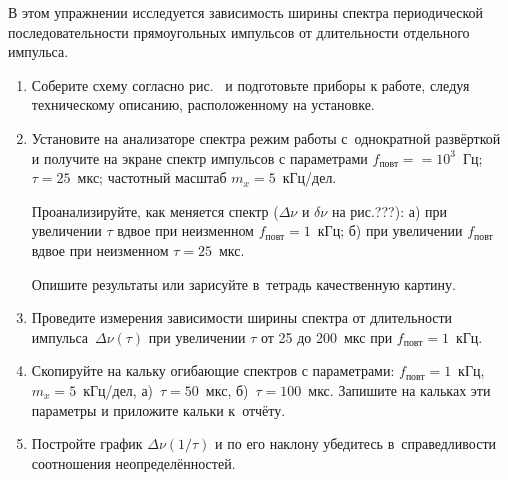 \begin{lab:task}

В этом упражнении исследуется зависимость ширины спектра периодической
последовательности прямоугольных импульсов от длительности отдельного импульса.

\begin{enumerate}
\item Соберите схему согласно рис.~ и
подготовьте приборы к работе, следуя техническому описанию, расположенному на
установке.

\item Установите на анализаторе спектра режим работы с~однократной
развёрткой и получите на экране спектр импульсов с параметрами
$f_\text{повт}==10^3$~Гц; $\tau=25$~мкс; частотный масштаб $m_x=5$~кГц/дел.

Проанализируйте, как меняется спектр ($\Delta\nu$ и $\delta\nu$ на
рис.???):
а) при увеличении $\tau$ вдвое при неизменном $f_\text{повт}=1$~кГц;
б) при увеличении $f_\text{повт}$ вдвое при неизменном $\tau=25$~мкс.

Опишите результаты или зарисуйте в~тетрадь качественную картину.

\item Проведите измерения зависимости ширины спектра от длительности
импульса~$\Delta \nu(\tau)$ при увеличении $\tau$ от 25 до 200~мкс при
$f_\text{повт}=1$~кГц.

\item Скопируйте на кальку  огибающие спектров с параметрами:
$f_\text{повт}=1$~кГц, $m_x=5$~кГц/дел, а)~$\tau=50$~мкс, б)~$\tau=100$~мкс.
Запишите на кальках эти параметры и приложите кальки к~отчёту.

\item Постройте график $\Delta \nu(1/\tau)$ и по его наклону убедитесь
в~справедливости соотношения неопределённостей.
\end{enumerate}
\end{lab:task}




